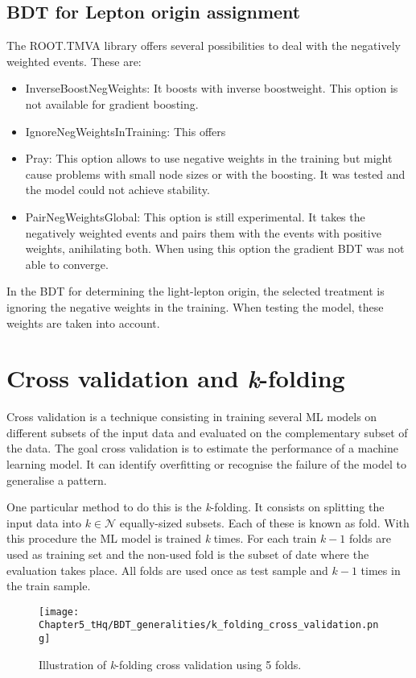 \subsection{BDT for Lepton origin assignment}
\label{chap:Appendix:BDT:NegWeigts:TMVARoot}
The ROOT.TMVA library offers several possibilities to deal with the negatively weighted events.
These are:
\begin{itemize}
	\item InverseBoostNegWeights: It boosts with inverse boostweight.
		This option is not available for gradient boosting.
	\item IgnoreNegWeightsInTraining: This offers 
	\item Pray: This option allows to use negative weights in the training but might cause 
		problems with small node sizes or with the boosting. It was tested and the model could not
		achieve stability. 
	\item PairNegWeightsGlobal: This option is still experimental. It takes the negatively 
		weighted events and pairs them with the events with positive weights, anihilating both.
		When using this option the gradient BDT was not able to converge.
\end{itemize}
In the BDT for determining the light-lepton origin, the selected treatment is ignoring the negative weights 
in the training. When testing the model, these weights are taken into account.


\section{Cross validation and \textit{k}-folding}
\label{chap:Appendix:BDT:kfold}
Cross validation is a technique consisting in training several ML models on different subsets of the input data
and evaluated on the complementary subset of the data. The goal cross validation is to estimate the
performance of a machine learning model. It can identify overfitting or recognise the failure of the model to
generalise a pattern.

One particular method to do this is the \textit{k}-folding. It consists on splitting the input data into 
$k \in \mathcal{N}$ equally-sized subsets. Each of these is known as fold. With this procedure the ML model is 
trained \textit{k} times. For each train $k-1$ folds are used as training set and the non-used fold is the subset 
of date where the evaluation takes place. All folds are used once as test sample and $k-1$ times in the train 
sample. 

\begin{figure}
\centering
  \centering
  \texttt{[image: Chapter5\_tHq/BDT\_generalities/k\_folding\_cross\_validation.png]}
\caption{Illustration of \textit{k}-folding cross validation using 5 folds.}
\label{fig:Appendix:BDT:kfold}
\end{figure}

